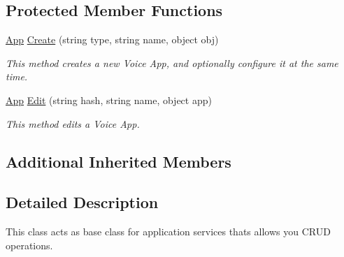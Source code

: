 \subsection*{Protected Member Functions}
\begin{DoxyCompactItemize}
\item 
\hyperlink{class_thecallr_api_1_1_objects_1_1_app_1_1_app}{App} \hyperlink{class_thecallr_api_1_1_services_1_1_client_1_1_apps_base_service_a28330950bff9a8a9ba69773e5efbc69d}{Create} (string type, string name, object obj)
\begin{DoxyCompactList}\small\item\em This method creates a new Voice App, and optionally configure it at the same time. \end{DoxyCompactList}\item 
\hyperlink{class_thecallr_api_1_1_objects_1_1_app_1_1_app}{App} \hyperlink{class_thecallr_api_1_1_services_1_1_client_1_1_apps_base_service_a10db4e2eee56c8561b384fbc6d1c1f05}{Edit} (string hash, string name, object app)
\begin{DoxyCompactList}\small\item\em This method edits a Voice App. \end{DoxyCompactList}\end{DoxyCompactItemize}
\subsection*{Additional Inherited Members}


\subsection{Detailed Description}
This class acts as base class for application services thats allows you C\+R\+U\+D operations. 



